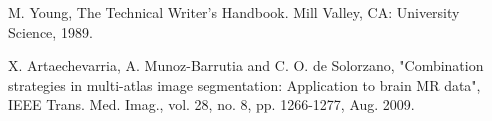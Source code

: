 \begin{thebibliography}{00}
 M. Young, The Technical Writer's Handbook. Mill Valley, CA: University Science, 1989. %

 \color{red} X. Artaechevarria, A. Munoz-Barrutia and C. O. de Solorzano, "Combination strategies in multi-atlas image segmentation: Application to brain MR data", IEEE Trans. Med. Imag., vol. 28, no. 8, pp. 1266-1277, Aug. 2009.

\end{thebibliography}

